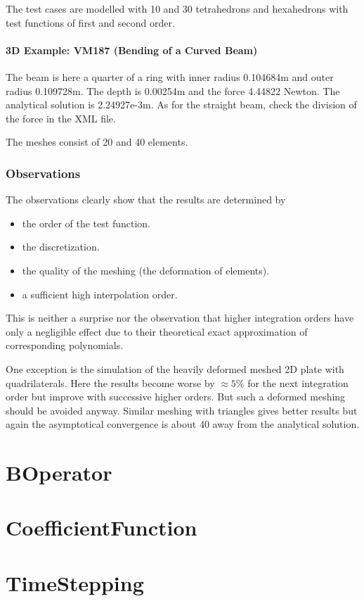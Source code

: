 The test cases  are modelled with 10 and 30  tetrahedrons and hexahedrons with
test functions of first and second order.

\paragraph{3D Example: VM187 (Bending of a Curved Beam)}
The beam  is here a quarter  of a ring  with inner radius 0.104684m  and outer
radius 0.109728m.  The depth  is 0.00254m  and the  force 4.44822  Newton. The
analytical  solution is  2.24927e-3m.  As  for the  straight  beam, check  the
division of the force in the XML file.

The meshes consist of 20 and 40 elements.

\subsubsection{Observations}
The observations clearly show that the results are determined by
\begin{itemize}
\item the order of the test function.
\item the discretization.
\item the quality of the meshing (the deformation of elements).
\item a sufficient high interpolation order.
\end{itemize}
This is neither a surprise nor  the observation that higher integration orders
have only a negligible effect due  to their theoretical exact approximation of
corresponding polynomials.

One exception is  the simulation of the heavily deformed  meshed 2D plate with
quadrilaterals. Here the  results become worse by $\approx 5  \%$ for the next
integration  order but  improve with  successive  higher orders.   But such  a
deformed  meshing should  be avoided  anyway. Similar  meshing with  triangles
gives better results  but again the asymptotical convergence is  about 40 away
from the analytical solution.


\section{BOperator}
\section{CoefficientFunction}
\section{TimeStepping}


